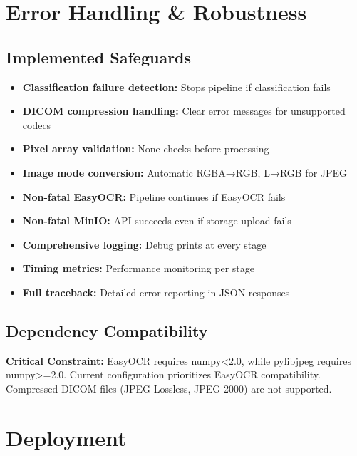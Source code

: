 \documentclass[12pt,a4paper]{article}
\begin{document}
\section{Error Handling \& Robustness}

\subsection{Implemented Safeguards}

\begin{itemize}[leftmargin=1.2cm]
    \item \textbf{Classification failure detection:} Stops pipeline if classification fails
    \item \textbf{DICOM compression handling:} Clear error messages for unsupported codecs
    \item \textbf{Pixel array validation:} None checks before processing
    \item \textbf{Image mode conversion:} Automatic RGBA→RGB, L→RGB for JPEG
    \item \textbf{Non-fatal EasyOCR:} Pipeline continues if EasyOCR fails
    \item \textbf{Non-fatal MinIO:} API succeeds even if storage upload fails
    \item \textbf{Comprehensive logging:} Debug prints at every stage
    \item \textbf{Timing metrics:} Performance monitoring per stage
    \item \textbf{Full traceback:} Detailed error reporting in JSON responses
\end{itemize}

\subsection{Dependency Compatibility}

\begin{tcolorbox}[colback=yellow!10,colframe=orange]
\textbf{Critical Constraint:} EasyOCR requires numpy<2.0, while pylibjpeg requires numpy>=2.0. Current configuration prioritizes EasyOCR compatibility. Compressed DICOM files (JPEG Lossless, JPEG 2000) are not supported.
\end{tcolorbox}

\section{Deployment}
\end{document}
